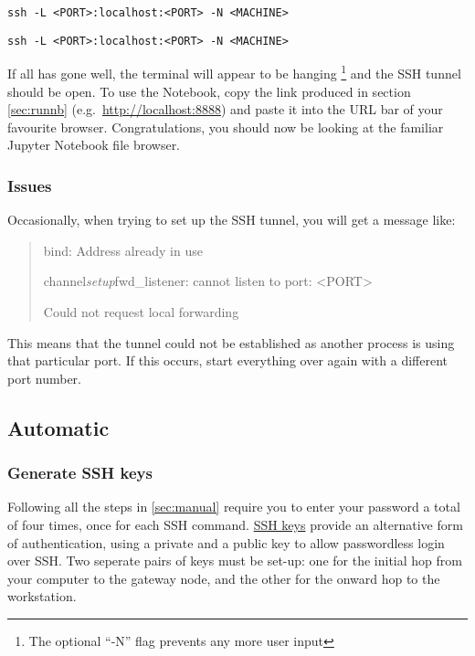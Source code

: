 \documentclass[a4paper]{article}
\begin{document}
\begin{lstlisting}[caption={Tunnel to gateway server}, label={lst:tunnel1}]
ssh -L <PORT>:localhost:<PORT> -N <MACHINE>
\end{lstlisting}

\begin{lstlisting}[caption={Tunnel to machine}, label={lst:tunnel2}]
ssh -L <PORT>:localhost:<PORT> -N <MACHINE>
\end{lstlisting}

If all has gone well, the terminal will appear to be hanging \footnote{The optional ``-N'' flag prevents any more user input} and the SSH tunnel should be open.
To use the Notebook, copy the link produced in section \ref{sec:runnb} (e.g.~\url{http://localhost:8888}) and paste it into the URL bar of your favourite browser. 
Congratulations, you should now be looking at the familiar Jupyter Notebook file browser. 

\subsubsection{Issues}

Occasionally, when trying to set up the SSH tunnel, you will get a message like:
\begin{quote}
bind: Address already in use

channel\emph{setup}fwd\_listener: cannot listen to port: \textless{}PORT\textgreater{}

Could not request local forwarding
\end{quote}

This means that the tunnel could not be established as another process is using that particular port.
If this occurs, start everything over again with a different port number.

\subsection{Automatic}
\label{sec:auto}

\subsubsection{Generate SSH keys}
\label{sec:sshkeys}
Following all the steps in \ref{sec:manual} require you to enter your password a total of four times, once for each SSH command.
\href{https://wiki.archlinux.org/index.php/SSH_keys}{SSH keys} provide an alternative form of authentication, using a private and a public key to allow passwordless login over SSH.
Two seperate pairs of keys must be set-up: one for the initial hop from your computer to the gateway node, and the other for the onward hop to the workstation.
\end{document}
